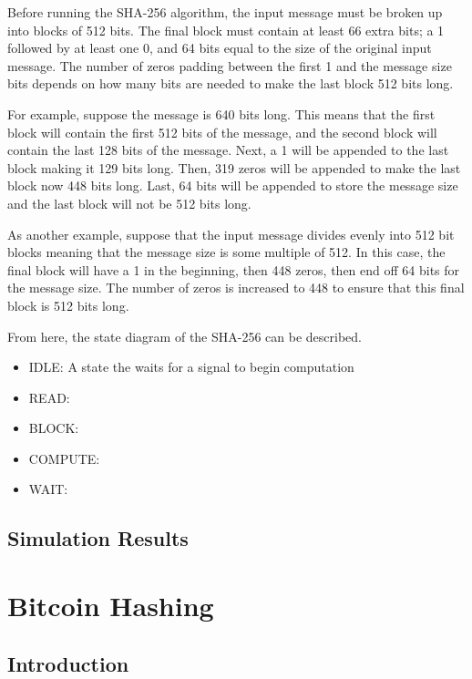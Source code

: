 \documentclass{article}
\begin{document}

Before running the SHA-256 algorithm, the input message must be broken up into blocks of 512 bits. The final block must contain at least 66 extra bits; a 1 followed by at least one 0, and 64 bits equal to the size of the original input message. The number of zeros padding between the first 1 and the message size bits depends on how many bits are needed to make the last block 512 bits long.

For example, suppose the message is 640 bits long. This means that the first block will contain the first 512 bits of the message, and the second block will contain the last 128 bits of the message. Next, a 1 will be appended to the last block making it 129 bits long. Then, 319 zeros will be appended to make the last block now 448 bits long. Last, 64 bits will be appended to store the message size and the last block will not be 512 bits long.

As another example, suppose that the input message divides evenly into 512 bit blocks meaning that the message size is some multiple of 512. In this case, the final block will have a 1 in the beginning, then 448 zeros, then end off 64 bits for the message size. The number of zeros is increased to 448 to ensure that this final block is 512 bits long.

From here, the state diagram of the SHA-256 can be described.
\begin{itemize}
  \item IDLE: A state the waits for a signal to begin computation
  \item READ:
  \item BLOCK:
  \item COMPUTE:
  \item WAIT:
\end{itemize}

\subsection{Simulation Results}


\newpage
\section{Bitcoin Hashing}

\subsection{Introduction}
\end{document}
